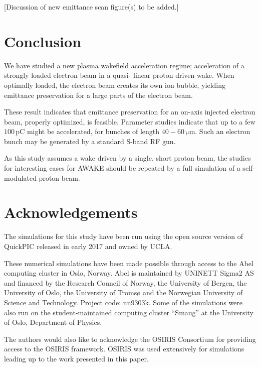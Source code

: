 \documentclass[aps,prstab,reprint,amsmath,amssymb,groupedaddress]{revtex4-1}
\newcommand{\unit}[1]{\,\mathrm{#1}}
\begin{document}
[Discussion of new emittance scan figure(s) to be added.]

\section[\label{S:C}]{Conclusion}

We have studied a new plasma wakefield acceleration regime; acceleration of a strongly loaded electron beam in a quasi-
linear proton driven wake. When optimally loaded, the electron beam creates its own ion bubble, yielding emittance
preservation for a large parts of the electron beam.

These result indicates that emittance preservation for an on-axis injected electron beam, properly optimized, is
feasible. Parameter studies indicate that up to a few $100\unit{pC}$ might be accelerated, for bunches of length
$40-60\unit{\mu m}$. Such an electron bunch may be generated by a standard S-band RF gun.

As this study assumes a wake driven by a single, short proton beam, the studies for interesting cases for AWAKE should
be repeated by a full simulation of a self-modulated proton beam.

\section[\label{Ack}]{Acknowledgements}

The simulations for this study have been run using the open source version of QuickPIC released in early 2017 and owned
by UCLA.

These numerical simulations have been made possible through access to the Abel computing cluster in Oslo, Norway. Abel
is maintained by UNINETT Sigma2 AS and financed by the Research Council of Norway, the University of Bergen, the
University of Oslo, the University of Tromsø and the Norwegian University of Science and Technology. Project code:
nn9303k. Some of the simulations were also run on the student-maintained computing cluster ``Smaug'' at the University
of Oslo, Department of Physics.

The authors would also like to acknowledge the OSIRIS Consortium for providing access to the OSIRIS framework. OSIRIS
was used extensively for simulations leading up to the work presented in this paper.


\end{document}
